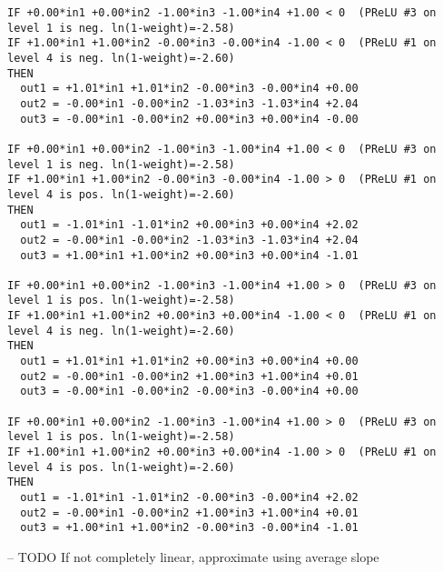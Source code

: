 \documentclass{article}[12pt]
\begin{document}
\begin{verbatim}
IF +0.00*in1 +0.00*in2 -1.00*in3 -1.00*in4 +1.00 < 0  (PReLU #3 on level 1 is neg. ln(1-weight)=-2.58)  
IF +1.00*in1 +1.00*in2 -0.00*in3 -0.00*in4 -1.00 < 0  (PReLU #1 on level 4 is neg. ln(1-weight)=-2.60)  
THEN    
  out1 = +1.01*in1 +1.01*in2 -0.00*in3 -0.00*in4 +0.00  
  out2 = -0.00*in1 -0.00*in2 -1.03*in3 -1.03*in4 +2.04  
  out3 = -0.00*in1 -0.00*in2 +0.00*in3 +0.00*in4 -0.00  
        
IF +0.00*in1 +0.00*in2 -1.00*in3 -1.00*in4 +1.00 < 0  (PReLU #3 on level 1 is neg. ln(1-weight)=-2.58)  
IF +1.00*in1 +1.00*in2 -0.00*in3 -0.00*in4 -1.00 > 0  (PReLU #1 on level 4 is pos. ln(1-weight)=-2.60)  
THEN    
  out1 = -1.01*in1 -1.01*in2 +0.00*in3 +0.00*in4 +2.02  
  out2 = -0.00*in1 -0.00*in2 -1.03*in3 -1.03*in4 +2.04  
  out3 = +1.00*in1 +1.00*in2 +0.00*in3 +0.00*in4 -1.01  
        
IF +0.00*in1 +0.00*in2 -1.00*in3 -1.00*in4 +1.00 > 0  (PReLU #3 on level 1 is pos. ln(1-weight)=-2.58)  
IF +1.00*in1 +1.00*in2 +0.00*in3 +0.00*in4 -1.00 < 0  (PReLU #1 on level 4 is neg. ln(1-weight)=-2.60)  
THEN    
  out1 = +1.01*in1 +1.01*in2 +0.00*in3 +0.00*in4 +0.00  
  out2 = -0.00*in1 -0.00*in2 +1.00*in3 +1.00*in4 +0.01  
  out3 = -0.00*in1 -0.00*in2 -0.00*in3 -0.00*in4 +0.00  
        
IF +0.00*in1 +0.00*in2 -1.00*in3 -1.00*in4 +1.00 > 0  (PReLU #3 on level 1 is pos. ln(1-weight)=-2.58)  
IF +1.00*in1 +1.00*in2 +0.00*in3 +0.00*in4 -1.00 > 0  (PReLU #1 on level 4 is pos. ln(1-weight)=-2.60)  
THEN    
  out1 = -1.01*in1 -1.01*in2 -0.00*in3 -0.00*in4 +2.02  
  out2 = -0.00*in1 -0.00*in2 +1.00*in3 +1.00*in4 +0.01  
  out3 = +1.00*in1 +1.00*in2 -0.00*in3 -0.00*in4 -1.01
\end{verbatim}



-- TODO If not completely linear, approximate using average slope
\end{document}
